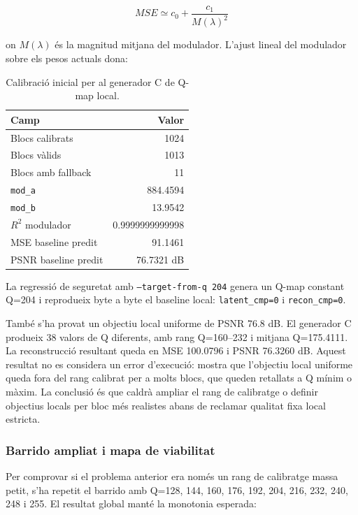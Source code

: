 \documentclass[11pt,a4paper]{article}
\begin{document}
\begin{equation}
  MSE \simeq c_0 + \frac{c_1}{M(\lambda)^2}
\end{equation}

on $M(\lambda)$ és la magnitud mitjana del modulador. L'ajust lineal del modulador sobre els pesos actuals dona:

\begin{table}[H]
\centering
\begin{tabular}{l r}
\toprule
\textbf{Camp} & \textbf{Valor} \\
\midrule
Blocs calibrats & 1024 \\
Blocs vàlids & 1013 \\
Blocs amb fallback & 11 \\
\texttt{mod\_a} & 884.4594 \\
\texttt{mod\_b} & 13.9542 \\
$R^2$ modulador & 0.9999999999998 \\
MSE baseline predit & 91.1461 \\
PSNR baseline predit & 76.7321 dB \\
\bottomrule
\end{tabular}
\caption{Calibració inicial per al generador C de Q-map local.}
\end{table}

La regressió de seguretat amb \texttt{--target-from-q 204} genera un Q-map constant Q=204 i reprodueix byte a byte el baseline local: \texttt{latent\_cmp=0} i \texttt{recon\_cmp=0}.

També s'ha provat un objectiu local uniforme de PSNR 76.8 dB. El generador C produeix 38 valors de Q diferents, amb rang Q=160--232 i mitjana Q=175.4111. La reconstrucció resultant queda en MSE 100.0796 i PSNR 76.3260 dB. Aquest resultat no es considera un error d'execució: mostra que l'objectiu local uniforme queda fora del rang calibrat per a molts blocs, que queden retallats a Q mínim o màxim. La conclusió és que caldrà ampliar el rang de calibratge o definir objectius locals per bloc més realistes abans de reclamar qualitat fixa local estricta.

\subsubsection{Barrido ampliat i mapa de viabilitat}

Per comprovar si el problema anterior era només un rang de calibratge massa petit, s'ha repetit el barrido amb Q=128, 144, 160, 176, 192, 204, 216, 232, 240, 248 i 255. El resultat global manté la monotonia esperada:
\end{document}
